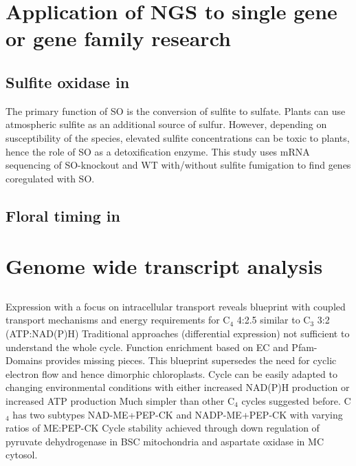 	
		
	
 \section{Application of NGS to single gene or gene family research}
 \subsection{Sulfite oxidase in }
 The primary function of \ac{SO} is the conversion of sulfite to sulfate.
 Plants can use atmospheric sulfite as an additional source of sulfur.
 However, depending on susceptibility of the species, elevated sulfite concentrations can be toxic to plants, hence the role of \ac{SO} as a detoxification enzyme.
 This study uses mRNA sequencing of  \ac{SO}-knockout and \ac{WT} with/without sulfite fumigation to find genes coregulated with \ac{SO}.
 
 
 \subsection{Floral timing in }
 
 \section{Genome wide transcript analysis}
 \subsection{}
 Expression with a focus on intracellular transport reveals blueprint with coupled transport mechanisms and energy requirements for C$_4$ 4:2.5 similar to C$_3$ 3:2 (ATP:NAD(P)H)
 Traditional approaches (differential expression) not sufficient to understand the whole cycle.
 Function enrichment based on EC and Pfam-Domains provides missing pieces.
 This blueprint supersedes the need for cyclic electron flow and hence dimorphic chloroplasts.
 Cycle can be easily adapted to changing environmental conditions with either increased NAD(P)H production or increased ATP production
 Much simpler than other C$_4$ cycles suggested before.
 C$_4$ has two subtypes NAD-ME+PEP-CK and NADP-ME+PEP-CK with varying ratios of ME:PEP-CK
 Cycle stability achieved through down regulation of pyruvate dehydrogenase in BSC mitochondria and aspartate oxidase in MC cytosol.
 
